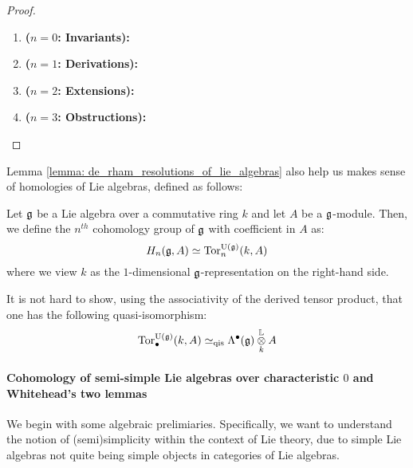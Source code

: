                         \begin{proof}
                            \noindent
                            \begin{enumerate}
                                \item \textbf{($n = 0$: Invariants):}
                                \item \textbf{($n = 1$: Derivations):}
                                \item \textbf{($n = 2$: Extensions):}
                                \item \textbf{($n = 3$: Obstructions):}
                            \end{enumerate}
                        \end{proof}
                    
                    Lemma \ref{lemma: de_rham_resolutions_of_lie_algebras} also help us makes sense of homologies of Lie algebras, defined as follows:
                    \begin{definition} \label{def: lie_algebra_homologies}
                        Let $\mathfrak{g}$ be a Lie algebra over a commutative ring $k$ and let $A$ be a $\mathfrak{g}$-module. Then, we define the $n^{th}$ cohomology group of $\mathfrak{g}$ with coefficient in $A$ as:
                            $$H_n(\mathfrak{g}, A) \simeq \mathrm{Tor}_n^{\mathrm{U}(\mathfrak{g})}(k, A)$$
                        where we view $k$ as the $1$-dimensional $\mathfrak{g}$-representation on the right-hand side. 
                    \end{definition}
                    \begin{remark}
                        It is not hard to show, using the associativity of the derived tensor product, that one has the following quasi-isomorphism:
                            $$\Tor_{\bullet}^{\U(\g)}(k, A) \cong_{\qis} \Lambda^{\bullet}(\g) \tensor_k^{\L} A$$
                    \end{remark}
                
                \paragraph{Cohomology of semi-simple Lie algebras over characteristic \texorpdfstring{$0$}{} and Whitehead's two lemmas}
                    We begin with some algebraic prelimiaries. Specifically, we want to understand the notion of (semi)simplicity within the context of Lie theory, due to simple Lie algebras not quite being simple objects in categories of Lie algebras.
                    \begin{definition} \label{def: lie_subalgebras_and_lie_ideals}
                        
                    \end{definition}
                    
